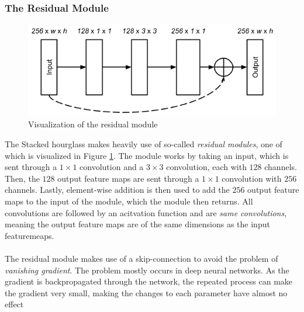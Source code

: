 \documentclass[./main.tex]{subfiles}
\begin{document}
\subsubsection{The Residual Module}
\begin{figure}[htbp]
    \centering
    \includegraphics[height = 3 cm]{entities/Residual.png}
    \caption{Visualization of the residual module \cite{Newell}}
    \label{fig:residual}
\end{figure}
\noindent The Stacked hourglass makes heavily use of so-called \textit{residual modules}, one of which is visualized in Figure \ref{fig:residual}. The module works by taking an input, which is sent through a $1 \times 1$ convolution and a $3 \times 3$ convolution, each with $128$ channels. Then, the $128$ output feature maps are sent through a $1 \times 1$ convolution with $256$ channels. Lastly, element-wise addition is then used to add the $256$ output feature maps to the input of the module, which the module then returns. All convolutions are followed by an acitvation function and are \textit{same convolutions}, meaning the output feature maps are of the same dimensions as the input featuremeaps.
\\
\\
The residual module makes use of a skip-connection to avoid the problem of \textit{vanishing gradient}. The problem mostly occurs in deep neural networks. As the gradient is backpropagated through the network, the repeated process can make the gradient very small, making the changes to each parameter have almost no effect
\end{document}
